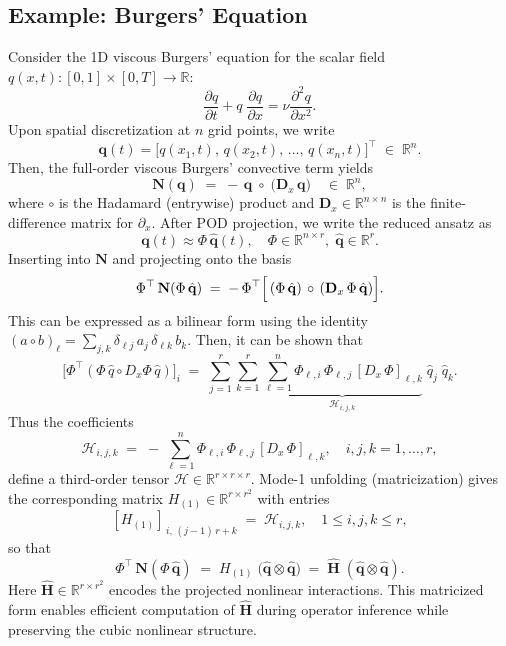 \subsection*{Example: Burgers' Equation}
Consider the 1D viscous Burgers' equation for the scalar field $q(x,t):[0,1]\times [0,T]\to\mathbb{R}$:\\
$$\frac{\partial q}{\partial t} + q\;\frac{\partial q}{\partial x} = \nu \frac{\partial^2 q}{\partial x^2}.$$
Upon spatial discretization at \(n\) grid points, we write\\
$$\mathbf{q}(t) = \bigl[q(x_1,t),\,q(x_2,t),\,\dots,\,q(x_n,t)\bigr]^{\top}
  \;\in\;\mathbb{R}^n.$$
Then, the full-order viscous Burgers’ convective term yields\\
$$\mathbf{N}(\mathbf{q}) \;=\; -\,\mathbf{q}\;\circ\;\bigl(\mathbf{D}_x\,\mathbf{q}\bigr)
\quad\in\;\mathbb{R}^n,$$
where $\circ$ is the Hadamard (entrywise) product and $\mathbf{D}_x\in\mathbb{R}^{n\times n}$ is the finite-difference matrix for $\partial_x$. After POD projection, we write the reduced ansatz as\\$$\mathbf{q}(t)\approx \Phi\,\hat{\mathbf{q}}(t),\quad \Phi\in\mathbb{R}^{n\times r},\;\hat{\mathbf{q}}\in\mathbb{R}^r.$$ Inserting into $\mathbf{N}$ and projecting onto the basis\\$$\Phi^{\top}\,\mathbf{N}(\Phi\,\hat{\mathbf{q}})\;=\;
    -\,\Phi^{\top} \Bigl[\,( \Phi\,\hat{\mathbf{q}})\,\circ\,(\mathbf{D}_x\,\Phi\,\hat{\mathbf{q}})\Bigr].$$
This can be expressed as a bilinear form using the identity $\displaystyle (a\circ b)_\ell = \sum_{j,k}\delta_{\ell j}\,a_j\,\delta_{\ell k}\,b_k$. Then, it can be shown that\\$$\bigl[\Phi^{\top}(\Phi\,\hat q\circ D_x\Phi\,\hat q)\bigr]_i
    \;=\;
    \sum_{j=1}^r\sum_{k=1}^r
      \underbrace{\sum_{\ell=1}^n \Phi_{\ell,i}\,\Phi_{\ell,j}\,[D_x\,\Phi]_{\ell,k}}_{\,\mathcal{H}_{i,j,k}\,}
    \;\hat q_j\;\hat q_k.$$
  Thus the coefficients\\
  $$\mathcal{H}_{i,j,k}
    \;=\;
    -\,\sum_{\ell=1}^n \Phi_{\ell,i}\,\Phi_{\ell,j}\,[D_x\,\Phi]_{\ell,k},
    \quad
    i,j,k=1,\dots,r,$$
  define a third-order tensor $\mathcal{H}\in\mathbb{R}^{r\times r\times r}$. Mode-1 unfolding (matricization) gives the corresponding matrix
  $H_{(1)}\in\mathbb{R}^{r\times r^2}$ with entries\\
  $$[H_{(1)}]_{\,i,\,(j-1)\,r + k}
    \;=\;
    \mathcal{H}_{i,j,k},
    \quad
    1\le i,j,k\le r,$$
  so that\\
  $$\Phi^{\top}\,\mathbf{N}(\Phi\,\hat{\mathbf{q}})
    \;=\;
    H_{(1)}\;\bigl(\hat{\mathbf{q}}\otimes\hat{\mathbf{q}}\bigr)
    \;=\;
    \hat{\mathbf{H}}\;(\hat{\mathbf{q}}\otimes\hat{\mathbf{q}}).$$
Here $\hat{\mathbf{H}} \in \mathbb{R}^{r \times r^2}$ encodes the projected nonlinear interactions. This matricized form enables efficient computation of $\hat{\mathbf{H}}$ during operator inference while preserving the cubic nonlinear structure.
\newpage

